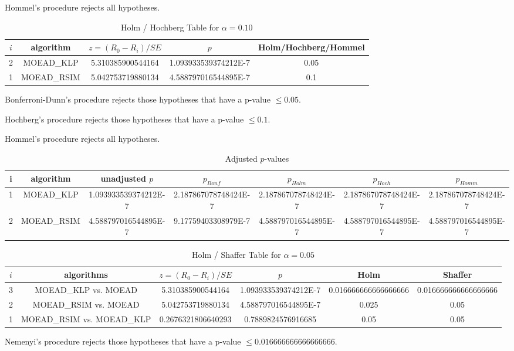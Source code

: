 \documentclass[a4paper,10pt]{article}
\begin{document}
\begin{landscape}
Hommel's procedure rejects all hypotheses.


\begin{table}[!htp]
\centering\tiny
\caption{Holm / Hochberg Table for $\alpha=0.10$}
\begin{tabular}{ccccc}
$i$&algorithm&$z=(R_0 - R_i)/SE$&$p$&Holm/Hochberg/Hommel\\
\hline
2&MOEAD_KLP&5.310385900544164&1.093933539374212E-7&0.05\\
1&MOEAD_RSIM&5.042753719880134&4.588797016544895E-7&0.1\\
\hline
\end{tabular}
\end{table}
Bonferroni-Dunn's procedure rejects those hypotheses that have a p-value $\le0.05$.


Hochberg's procedure rejects those hypotheses that have a p-value $\le0.1$.


Hommel's procedure rejects all hypotheses.


\begin{table}[!htp]
\centering\tiny
\caption{Adjusted $p$-values}
\begin{tabular}{ccccccc}
i&algorithm&unadjusted $p$&$p_{Bonf}$&$p_{Holm}$&$p_{Hoch}$&$p_{Homm}$\\
\hline
1&MOEAD_KLP&1.093933539374212E-7&2.187867078748424E-7&2.187867078748424E-7&2.187867078748424E-7&2.187867078748424E-7\\
2&MOEAD_RSIM&4.588797016544895E-7&9.17759403308979E-7&4.588797016544895E-7&4.588797016544895E-7&4.588797016544895E-7\\
\hline
\end{tabular}
\end{table}

\begin{table}[!htp]
\centering\tiny
\caption{Holm / Shaffer Table for $\alpha=0.05$}
\begin{tabular}{cccccc}
$i$&algorithms&$z=(R_0 - R_i)/SE$&$p$&Holm&Shaffer\\
\hline
3&MOEAD_KLP vs. MOEAD&5.310385900544164&1.093933539374212E-7&0.016666666666666666&0.016666666666666666\\
2&MOEAD_RSIM vs. MOEAD&5.042753719880134&4.588797016544895E-7&0.025&0.05\\
1&MOEAD_RSIM vs. MOEAD_KLP&0.2676321806640293&0.7889824576916685&0.05&0.05\\
\hline
\end{tabular}
\end{table}
Nemenyi's procedure rejects those hypotheses that have a p-value $\le0.016666666666666666$.



\end{landscape}
\end{document}

